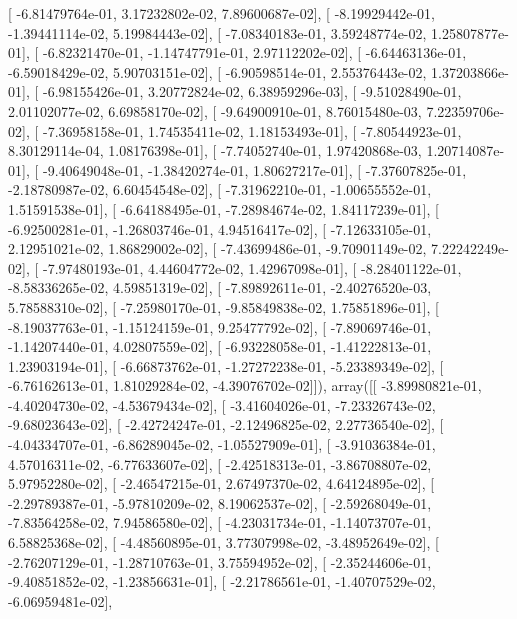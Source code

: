 \documentclass{article}
\begin{document}
       [ -6.81479764e-01,   3.17232802e-02,   7.89600687e-02],
       [ -8.19929442e-01,  -1.39441114e-02,   5.19984443e-02],
       [ -7.08340183e-01,   3.59248774e-02,   1.25807877e-01],
       [ -6.82321470e-01,  -1.14747791e-01,   2.97112202e-02],
       [ -6.64463136e-01,  -6.59018429e-02,   5.90703151e-02],
       [ -6.90598514e-01,   2.55376443e-02,   1.37203866e-01],
       [ -6.98155426e-01,   3.20772824e-02,   6.38959296e-03],
       [ -9.51028490e-01,   2.01102077e-02,   6.69858170e-02],
       [ -9.64900910e-01,   8.76015480e-03,   7.22359706e-02],
       [ -7.36958158e-01,   1.74535411e-02,   1.18153493e-01],
       [ -7.80544923e-01,   8.30129114e-04,   1.08176398e-01],
       [ -7.74052740e-01,   1.97420868e-03,   1.20714087e-01],
       [ -9.40649048e-01,  -1.38420274e-01,   1.80627217e-01],
       [ -7.37607825e-01,  -2.18780987e-02,   6.60454548e-02],
       [ -7.31962210e-01,  -1.00655552e-01,   1.51591538e-01],
       [ -6.64188495e-01,  -7.28984674e-02,   1.84117239e-01],
       [ -6.92500281e-01,  -1.26803746e-01,   4.94516417e-02],
       [ -7.12633105e-01,   2.12951021e-02,   1.86829002e-02],
       [ -7.43699486e-01,  -9.70901149e-02,   7.22242249e-02],
       [ -7.97480193e-01,   4.44604772e-02,   1.42967098e-01],
       [ -8.28401122e-01,  -8.58336265e-02,   4.59851319e-02],
       [ -7.89892611e-01,  -2.40276520e-03,   5.78588310e-02],
       [ -7.25980170e-01,  -9.85849838e-02,   1.75851896e-01],
       [ -8.19037763e-01,  -1.15124159e-01,   9.25477792e-02],
       [ -7.89069746e-01,  -1.14207440e-01,   4.02807559e-02],
       [ -6.93228058e-01,  -1.41222813e-01,   1.23903194e-01],
       [ -6.66873762e-01,  -1.27272238e-01,  -5.23389349e-02],
       [ -6.76162613e-01,   1.81029284e-02,  -4.39076702e-02]]), array([[ -3.89980821e-01,  -4.40204730e-02,  -4.53679434e-02],
       [ -3.41604026e-01,  -7.23326743e-02,  -9.68023643e-02],
       [ -2.42724247e-01,  -2.12496825e-02,   2.27736540e-02],
       [ -4.04334707e-01,  -6.86289045e-02,  -1.05527909e-01],
       [ -3.91036384e-01,   4.57016311e-02,  -6.77633607e-02],
       [ -2.42518313e-01,  -3.86708807e-02,   5.97952280e-02],
       [ -2.46547215e-01,   2.67497370e-02,   4.64124895e-02],
       [ -2.29789387e-01,  -5.97810209e-02,   8.19062537e-02],
       [ -2.59268049e-01,  -7.83564258e-02,   7.94586580e-02],
       [ -4.23031734e-01,  -1.14073707e-01,   6.58825368e-02],
       [ -4.48560895e-01,   3.77307998e-02,  -3.48952649e-02],
       [ -2.76207129e-01,  -1.28710763e-01,   3.75594952e-02],
       [ -2.35244606e-01,  -9.40851852e-02,  -1.23856631e-01],
       [ -2.21786561e-01,  -1.40707529e-02,  -6.06959481e-02],
\end{document}
